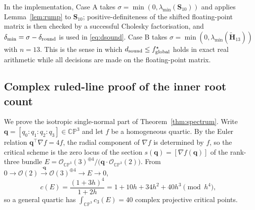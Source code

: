 In the implementation, Case A takes $\sigma=\min(0,\lambda_{\min}(\mathbf S_{10}))$ and applies Lemma~\ref{lem:rump} to $\mathbf S_{10}$; positive-definiteness of the shifted floating-point matrix is then checked by a successful Cholesky factorisation, and $\delta_{\min}=\sigma-\delta_{\rm round}$ is used in \eqref{eq:dsound}. Case B takes $\sigma=\min(0,\lambda_{\min}(\tilde{\mathbf H}_{13}))$ with $n=13$. This is the sense in which $d_{\rm sound}\le f^\star_{\rm global}$ holds in exact real arithmetic while all decisions are made on the floating-point matrix.

\subsection{Complex ruled-line proof of the inner root count}\label{app:ruled}
We prove the isotropic single-normal part of Theorem~\ref{thm:spectrum}. Write $\mathbf q=[q_0:q_1:q_2:q_3]\in\mathbb{CP}^3$ and let $f$ be a homogeneous quartic. By the Euler relation $\mathbf q^\top\nabla f=4f$, the radial component of $\nabla f$ is determined by $f$, so the critical scheme is the zero locus of the section $s(\mathbf q)=[\nabla f(\mathbf q)]$ of the rank-three bundle $E=\mathcal O_{\mathbb{CP}^3}(3)^{\oplus4}/\big(\mathbf q\cdot\mathcal O_{\mathbb{CP}^3}(2)\big)$. From $0\to\mathcal O(2)\xrightarrow{\cdot\mathbf q}\mathcal O(3)^{\oplus4}\to E\to0$,
\begin{equation}
c(E)=\frac{(1+3h)^4}{1+2h}=1+10h+34h^2+40h^3\pmod{h^4},
\label{eq:cE}
\end{equation}
so a general quartic has $\int_{\mathbb{CP}^3}c_3(E)=40$ complex projective critical points.


